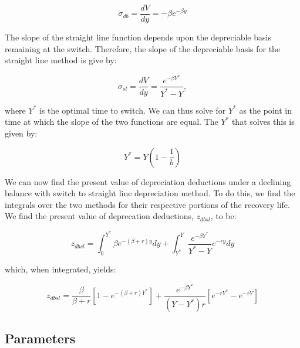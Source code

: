 \documentclass[article,11pt,letterpaper,fleqn]{article}
\theoremstyle{definition}
\numberwithin{equation}{section}
\begin{document}

\begin{equation}
\sigma_{db} = \frac{dV}{dy}=-\beta e^{-\beta y}
\end{equation}

\noindent\noindent The slope of the straight line function depends upon the depreciable basis remaining at the switch.  Therefore, the slope of the depreciable basis for the straight line method is give by:

\begin{equation}
\sigma_{sl} =  \frac{dV}{dy}=\frac{e^{-\beta Y^{*}}}{Y^{*}-Y},
\end{equation}

\noindent\noindent where $Y^{*}$ is the optimal time to switch. We can thus solve for $Y^{*}$ as the point in time at which the slope of the two functions are equal.  The $Y^{*}$ that solves this is given by:

\begin{equation}
Y^{*}=Y\left(1-\frac{1}{b}\right)
\end{equation}

We can now find the present value of depreciation deductions under a declining balance with switch to straight line depreciation method.  To do this, we find the integrals over the two methods for their respective portions of the recovery life.  We find the present value of deprecation deductions, $z_{dbsl}$, to be:

\begin{equation}
z_{dbsl}=\int_{0}^{Y^{*}}\beta e^{-(\beta+r)y}dy+\int_{Y^{*}}^{Y}\frac{e^{-\beta Y^{*}}}{Y^{*}-Y}e^{-ry}dy
\end{equation}

\noindent\noindent which, when integrated, yields:

\begin{equation}
z_{dbsl}=\frac{\beta}{\beta+r}\left[1-e^{-(\beta+r)Y^{*}}\right]+\frac{e^{-\beta Y^{*}}}{(Y-Y^{*})r}\left[e^{-rY^{*}}-e^{-rY}\right]
\end{equation}


\subsection{Parameters}
\end{document}
